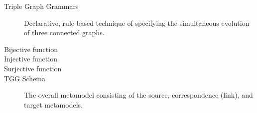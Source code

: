 \begin{description}

\item[Triple Graph Grammars] Declarative, rule-based technique of specifying the simultaneous evolution of three connected graphs.

\item[Bijective function]

\item[Injective function]

\item[Surjective function]

\item[TGG Schema] The overall metamodel consisting of the source, correspondence (link), and target metamodels.

\end{description}